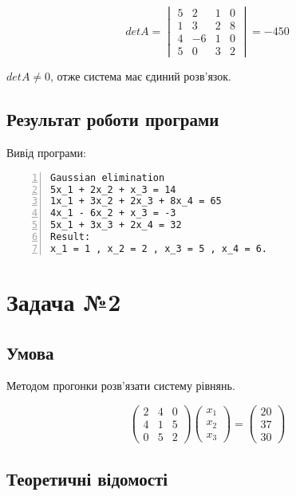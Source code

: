 \documentclass[a4paper, 12pt]{article}
\begin{document}
\[
detA = 
\begin{vmatrix}
5 & 2 & 1 & 0\\
1 & 3 & 2 & 8\\
4 & -6 & 1 & 0\\
5 & 0 & 3 & 2
\end{vmatrix}
= -450
\]

$det A \neq 0$, отже система має єдиний розв'язок.

\subsection{Результат роботи програми}

Вивід програми:

\begin{Verbatim}[numbers=left,xleftmargin=20mm]
Gaussian elimination
5x_1 + 2x_2 + x_3 = 14
1x_1 + 3x_2 + 2x_3 + 8x_4 = 65
4x_1 - 6x_2 + x_3 = -3
5x_1 + 3x_3 + 2x_4 = 32
Result:
x_1 = 1 , x_2 = 2 , x_3 = 5 , x_4 = 6.
\end{Verbatim}

\newpage
\section{Задача №2}

\subsection{Умова}

Методом прогонки розв’язати систему рівнянь.

\[
\begin{pmatrix}
2 & 4 & 0\\
4 & 1 & 5\\
0 & 5 & 2
\end{pmatrix}
\begin{pmatrix}
x_1\\
x_2\\
x_3
\end{pmatrix}
=
\begin{pmatrix}
20\\
37\\
30
\end{pmatrix}
\]

\subsection{Теоретичні відомості}
\end{document}
